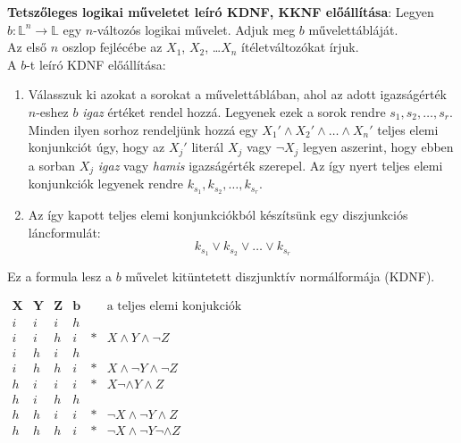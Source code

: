 \documentclass[tikz,12pt,margin=0px]{article}
\begin{document}
	\noindent \textbf{Tetszőleges logikai műveletet leíró KDNF, KKNF előállítása}:	Legyen $b: \mathbb{L}^{n} \to \mathbb{L}$
	egy $n$-változós logikai művelet. Adjuk meg $b$ művelettábláját.\\

	\noindent Az első $n$ oszlop fejlécébe az $X_{1}$, $X_{2}$, \ldots $X_{n}$ ítéletváltozókat írjuk.\\
	
	\noindent A $b$-t leíró KDNF előállítása:
	
	\begin{enumerate}
        \item Válasszuk ki azokat a sorokat a művelettáblában, ahol az adott igazságérték $n$-eshez $b$ \textit{igaz} értéket rendel hozzá. Legyenek ezek a sorok rendre $s_{1}, s_{2}, \ldots, s_{r}$. Minden ilyen sorhoz rendeljünk hozzá egy $X_{1}' \wedge X_{2}' \wedge \ldots \wedge X_{n}'$ teljes elemi konjunkciót úgy, hogy az $X_{j}'$ literál $X_{j}$ vagy $\neg X_{j}$ legyen aszerint, hogy ebben a sorban $X_{j}$ \textit{igaz} vagy \textit{hamis} igazságérték szerepel. Az így nyert teljes elemi konjunkciók legyenek rendre $k_{s_{1}}, k_{s_{2}}, \ldots, k_{s_{r}}$.
		
		\item	Az így kapott teljes elemi konjunkciókból készítsünk egy diszjunkciós láncformulát:
        \[
		  k_{s_{1}} \vee k_{s_{2}} \vee \ldots \vee k_{s_{r}}
        \]
	\end{enumerate}

    \noindent Ez a formula lesz a $b$ művelet kitüntetett diszjunktív normálformája (KDNF).

	\begin{center}
      $\begin{array}{c|c|c||c|c|c}
        \textbf{X} & \textbf{Y} & \textbf{Z} & \textbf{b} &   & \text{a teljes elemi konjukciók} \\ \hline
        i & i & i & h &   & \\ \hline
        i & i & h & i & * & X \wedge Y \wedge \neg Z \\ \hline
        i & h & i & h &   & \\ \hline
        i & h & h & i & * & X \wedge \neg Y \wedge \neg Z \\ \hline
        h & i & i & i & * & X \neg \wedge Y \wedge Z \\ \hline
        h & i & h & h &   & \\ \hline
        h & h & i & i & * & \neg X \wedge \neg Y \wedge Z \\ \hline
        h & h & h & i & * & \neg X \wedge \neg Y \neg \wedge Z
      \end{array}$
	\end{center}
	
\end{document}
